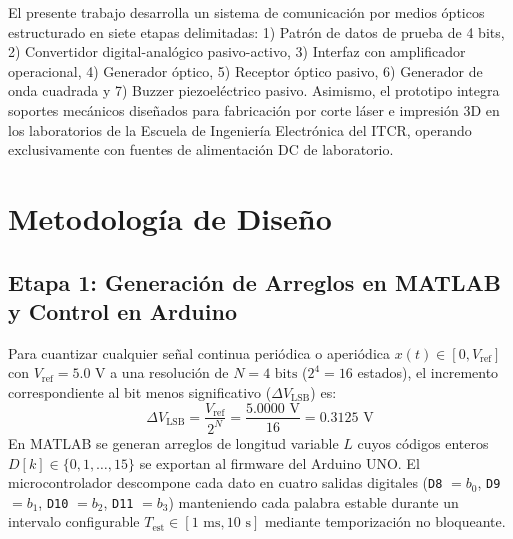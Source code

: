 \documentclass[journal,transmag]{IEEEtran}
\begin{document}
El presente trabajo desarrolla un sistema de comunicación por medios ópticos estructurado en siete etapas delimitadas: 1) Patrón de datos de prueba de 4 bits, 2) Convertidor digital-analógico pasivo-activo, 3) Interfaz con amplificador operacional, 4) Generador óptico, 5) Receptor óptico pasivo, 6) Generador de onda cuadrada y 7) Buzzer piezoeléctrico pasivo. Asimismo, el prototipo integra soportes mecánicos diseñados para fabricación por corte láser e impresión 3D en los laboratorios de la Escuela de Ingeniería Electrónica del ITCR, operando exclusivamente con fuentes de alimentación DC de laboratorio.

\section{Metodología de Diseño}

\subsection{Etapa 1: Generación de Arreglos en MATLAB y Control en Arduino}
Para cuantizar cualquier señal continua periódica o aperiódica $x(t) \in [0, V_{\text{ref}}]$ con $V_{\text{ref}} = 5.0\text{ V}$ a una resolución de $N = 4\text{ bits}$ ($2^4 = 16$ estados), el incremento correspondiente al bit menos significativo ($\Delta V_{\text{LSB}}$) es:
\begin{equation}
\Delta V_{\text{LSB}} = \frac{V_{\text{ref}}}{2^N} = \frac{5.0000\text{ V}}{16} = 0.3125\text{ V}
\end{equation}
En MATLAB se generan arreglos de longitud variable $L$ cuyos códigos enteros $D[k] \in \{0, 1, \dots, 15\}$ se exportan al firmware del Arduino UNO. El microcontrolador descompone cada dato en cuatro salidas digitales (\texttt{D8} $= b_0$, \texttt{D9} $= b_1$, \texttt{D10} $= b_2$, \texttt{D11} $= b_3$) manteniendo cada palabra estable durante un intervalo configurable $T_{\text{est}} \in [1\text{ ms}, 10\text{ s}]$ mediante temporización no bloqueante.
\end{document}
